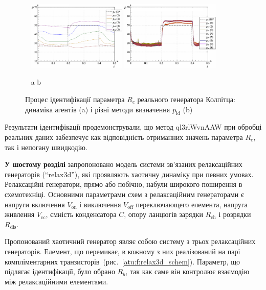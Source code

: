 \documentclass[a4paper,13pt]{atuaref}
\newcommand{\Tidx}[1]{%
  _\mathrm{#1}
}
\begin{document}
\begin{figure}[htb!]
  \centerline{
    ~ \hfill
    \includegraphics[width=0.42\textwidth]{p6/p/r/colp_real_id-p_t_pi_ql3rlWvnAAW_real_d_0_xl.png}
    \hfill
    \includegraphics[width=0.42\textwidth]{p6/p/r/colp_real_id-p_t_p_ql3rlWvnAAW_real_d_0_xl.png}
    \hfill ~
  }
  \vspace{-1.5ex}
  \begin{center}
    ~ \hfill a \hfill\hfill b \hfill ~
  \end{center}
  \vspace{-2.5ex}
  \caption{Процес ідентифікації параметра $R_c$ реального генератора Колпітца:
  динаміка агентів (a) і різні методи визначення $p_\mathrm{id}$ (b)}
  \label{atu:f:colp_r_id_1}
\end{figure}

Результати ідентифікації продемонстрували, що метод ql3rlWvnAAW
при обробці реальних даних забезпечує как відповідність отриманних значень параметра $R_c$,
так і непогану швидкодію.



\textbf{У шостому розділі}
запропоновано модель
системи зв'язаних релаксаційних генераторів (``relax3d''),
які проявляють хаотичну динаміку при певних умовах.
Релаксаційні генератори, прямо або побічно, набули широкого поширення в схемотехніці.
Основними параметрами схем з релаксаційним генераторами є напруги включення
$V\Tidx{on}$ і виключення $V \Tidx{off}$ переключающего елемента,
напруга живлення $V\Tidx{cc}$, ємність конденсатора $C$, опору ланцюгів
зарядки $R\Tidx{ch}$ і розрядки $R\Tidx {dis}$.

Пропонований хаотичний генератор являє собою систему з трьох релаксаційних
генераторів. Елемент, що перемикає, в кожному з них реалізований на парі
компліментарних транзисторів~(рис.~\ref{atu:f:relax3d_schem}).
Параметр, що підлягає ідентифікації, було обрано $R_b$,
так как саме він контролює взаємодію між релаксаційними елементами.
\end{document}
